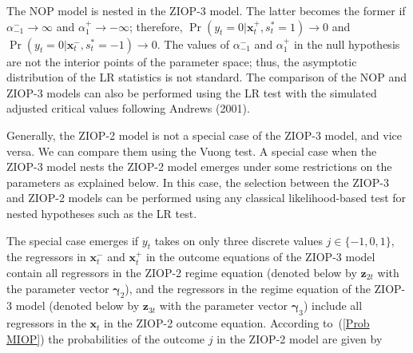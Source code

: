 \documentclass[letterpaper,fleqn,12pt]{article}
\begin{document}
The NOP model is nested in the ZIOP-3 model. The latter becomes the former
if $\alpha _{-1}^{-}\rightarrow \infty $ and $\alpha _{1}^{+}\rightarrow
-\infty $; therefore, $\Pr (y_{t}=0|\mathbf{x}_{t}^{+},s_{t}^{\ast
}=1)\rightarrow 0$ and $\Pr (y_{t}=0|\mathbf{x}_{t}^{-},s_{t}^{\ast
}=-1)\rightarrow 0$. The values of $\alpha _{-1}^{-}$ and $\alpha _{1}^{+}$
in the null hypothesis are not the interior points of the parameter space;
thus, the asymptotic distribution of the LR statistics is not standard. The
comparison of the NOP and ZIOP-3 models can also be performed using the LR
test with the simulated adjusted critical values following Andrews (2001).

Generally, the ZIOP-2 model is not a special case of the ZIOP-3 model, and
vice versa. We can compare them using the Vuong test. A special case when
the ZIOP-3 model nests the ZIOP-2 model emerges under some restrictions on
the parameters as explained below. In this case, the selection between the
ZIOP-3 and ZIOP-2 models can be performed using any classical
likelihood-based test for nested hypotheses such as the LR test.

The special case emerges if $y_{t}$ takes on only three discrete values $%
j\in \{-1,0,1\}$, the regressors in $\mathbf{x}_{t}^{-}$ and $\mathbf{x}%
_{t}^{+}$ in the outcome equations of the ZIOP-3 model contain all
regressors in the ZIOP-2 regime equation (denoted below by $\mathbf{z}_{2t}$
with the parameter vector $\mathbf{\gamma }_{2}$), and the regressors in the
regime equation of the ZIOP-3 model (denoted below by $\mathbf{z}_{3t}$ with
the parameter vector $\mathbf{\gamma }_{3}$) include all regressors in the $%
\mathbf{x}_{t}$ in the ZIOP-2 outcome equation. According to\ (\ref{Prob
MIOP}) the probabilities of the outcome $j$ in the ZIOP-2 model are given by
\end{document}

